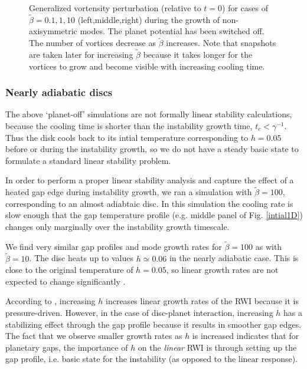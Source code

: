 \begin{figure}
{  }  
  \caption{Generalized vortensity perturbation (relative to $t=0$) for
    cases of $\tilde{\beta}=0.1,1,10$ (left,middle,right) during
    the growth of non-axisymmetric modes. The planet potential has
    been switched off.  The number of vortices
    decrease as $\tilde{\beta}$ increases. Note that snapshots are
    taken later for increasing $\tilde{\beta}$ because it takes longer
    for the vortices to grow and become visible with increasing cooling time. 
    \label{2Dlinear} 
  } 
\end{figure}

\subsubsection{Nearly adiabatic discs}
\label{adiabatic_section}

The above `planet-off' simulations are not formally linear
stability calculations, because the cooling time is shorter
than the instability growth time, 
$t_c<\gamma^{-1}$.  
Thus the disk cools back to its intial temperature corresponding to
$h=0.05$ before or during the instability growth, so we do not
have a steady basic state to formulate a standard linear stability 
problem. 

In order to perform a proper linear stability analysis and capture the
effect of a heated gap edge during instability growth, we ran a simulation  with
$\tilde{\beta}=100$, corresponding to an almost adiabtaic disc.  
In this simulation the cooling rate is slow enough that the gap 
temperature profile (e.g. middle panel of Fig. \ref{intial1D}) changes
only marginally over the instability growth timescale. 

We find very similar gap profiles and mode growth rates for
$\tilde{\beta}=100$ as with $\tilde{\beta}=10$. The disc heats up to
values $h\simeq0.06$ in the nearly adiabatic case. This is close to
the original temperature of $h=0.05$, so linear growth rates are not expected
to change significantly \citep{li00}. 

According to \cite{li00}, increasing $h$ increases linear growth rates
of the RWI because it is pressure-driven. However, in the case 
of disc-planet interaction, increasing $h$ has a stabilizing effect
through the gap profile because it results in smoother gap
edges. The fact that we observe smaller growth rates as $h$ is
increased indicates that for planetary gaps, the importance of $h$ on
the \emph{linear} RWI is through setting up the gap profile, i.e. basic
state for the instability (as opposed to the linear response). 

